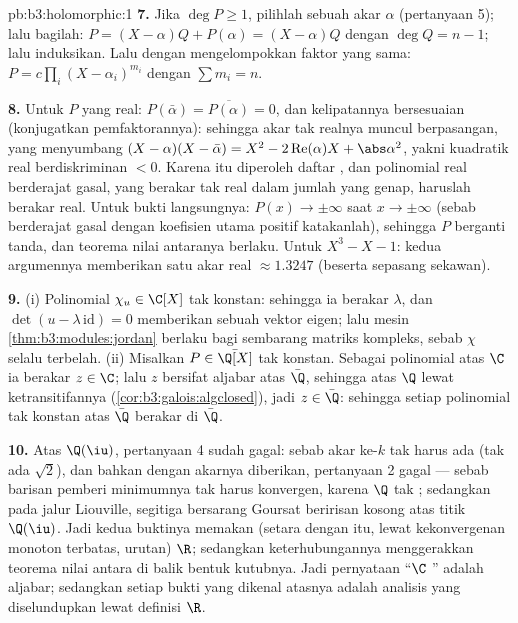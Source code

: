 \begin{solution}{pb:b3:holomorphic:1}
\textbf{7.} Jika $\deg P \geq 1$, pilihlah sebuah akar $\alpha$
(pertanyaan 5); lalu bagilah: $P = (X - \alpha)Q + P(\alpha) = (X -
\alpha)Q$ dengan $\deg Q = n - 1$; lalu induksikan. Lalu dengan mengelompokkan faktor
yang sama: $P = c\prod_i(X - \alpha_i)^{m_i}$ dengan $\sum m_i = n$.

\textbf{8.} Untuk $P$ yang real: $P(\bar\alpha) =
\overline{P(\alpha)} = 0$, dan kelipatannya bersesuaian
(konjugatkan pemfaktorannya): sehingga akar tak realnya muncul berpasangan,
yang menyumbang $(X - \alpha)(X - \bar\alpha) = X^2 -
2\operatorname{Re}(\alpha)X + \abs\alpha^2$, yakni kuadratik real
berdiskriminan $< 0$. Karena itu diperoleh daftar , dan polinomial real berderajat gasal, yang berakar
tak real dalam jumlah yang genap, haruslah berakar real. Untuk bukti
langsungnya: $P(x) \to \pm\infty$ saat $x \to \pm\infty$ (sebab berderajat gasal
dengan koefisien utama positif katakanlah), sehingga $P$ berganti tanda, dan
teorema nilai antaranya berlaku. Untuk $X^3 - X - 1$:
kedua argumennya memberikan satu akar real $\approx 1.3247$
(beserta sepasang sekawan).

\textbf{9.} (i) Polinomial $\chi_u \in \C[X]$ tak konstan: sehingga ia
berakar $\lambda$, dan $\det(u - \lambda\,\mathrm{id}) = 0$
memberikan sebuah vektor eigen; lalu mesin 
\cref{thm:b3:modules:jordan} berlaku bagi sembarang matriks kompleks,
sebab $\chi$ selalu terbelah. (ii) Misalkan $P \in \bar\Q[X]$
tak konstan. Sebagai polinomial atas $\C$ ia berakar $z
\in \C$; lalu $z$ bersifat aljabar atas $\bar\Q$, sehingga atas $\Q$ lewat
ketransitifannya (\cref{cor:b3:galois:algclosed}), jadi $z \in
\bar\Q$: sehingga setiap polinomial tak konstan atas $\bar\Q$ berakar
di $\bar\Q$.

\textbf{10.} Atas $\Q(\iu)$, pertanyaan 4 sudah gagal:
sebab akar ke-$k$ tak harus ada (tak ada $\sqrt2$), dan bahkan dengan
akarnya diberikan, pertanyaan 2 gagal --- sebab barisan pemberi minimumnya tak harus
konvergen, karena $\Q$ tak ; sedangkan pada jalur Liouville,
segitiga  bersarang Goursat beririsan kosong
atas titik $\Q(\iu)$. Jadi kedua buktinya memakan 
(setara dengan itu, lewat kekonvergenan monoton terbatas, 
urutan) $\R$; sedangkan keterhubungannya menggerakkan teorema
nilai antara di balik bentuk kutubnya. Jadi pernyataan
``$\C$ '' adalah aljabar; sedangkan setiap bukti
yang dikenal atasnya adalah analisis yang diselundupkan lewat definisi
$\R$.


\end{solution}
